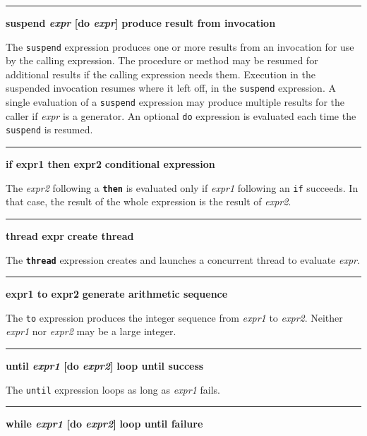 \bigskip\hrule\vspace{0.1cm}
\noindent
{\bf \textbf{suspend} \textit{expr} [do \textit{expr}] } \hfill {\bf produce result from invocation}

\noindent
{}The \texttt{suspend} expression produces one or more
results from an invocation for use by the calling expression. The
procedure or method may be resumed for additional results if the
calling expression needs them. Execution in the suspended invocation
resumes where it left off, in the \texttt{suspend} expression. A single
evaluation of a \texttt{suspend} expression may produce multiple
results for the caller if \textit{expr} is a
generator. An optional \texttt{do} expression is
evaluated each time the \texttt{suspend} is resumed.

\bigskip\hrule\vspace{0.1cm}
\noindent
{\bf if expr1 then expr2 } \hfill {\bf conditional expression}

\noindent
{}The \textit{expr2} following a \texttt{\bf then} is evaluated
only if \textit{expr1} following an \texttt{if} succeeds. In that case,
the result of the whole expression is the result of \textit{expr2}.


\bigskip\hrule\vspace{0.1cm}
\noindent
{\bf thread expr } \hfill {\bf create thread}

\noindent
{}The \texttt{\bf thread} expression creates and launches
a concurrent thread to evaluate \textit{expr}.

\bigskip\hrule\vspace{0.1cm}
\noindent
{\bf expr1 to expr2 } \hfill {\bf generate arithmetic sequence}

\noindent
{}The \texttt{to} expression produces the integer
sequence from \textit{expr1} to \textit{expr2}.
Neither \textit{expr1} nor \textit{expr2} may be a large integer.

\bigskip\hrule\vspace{0.1cm}
\noindent
{\bf \textbf{until} \textit{expr1} [do \textit{expr2}] } \hfill {\bf loop until success}

\noindent
{}The \texttt{until} expression loops as long
as \textit{expr1} fails.

\bigskip\hrule\vspace{0.1cm}
\noindent
{\bf \textbf{while} \textit{expr1} [do \textit{expr2}] } \hfill {\bf loop until failure}

